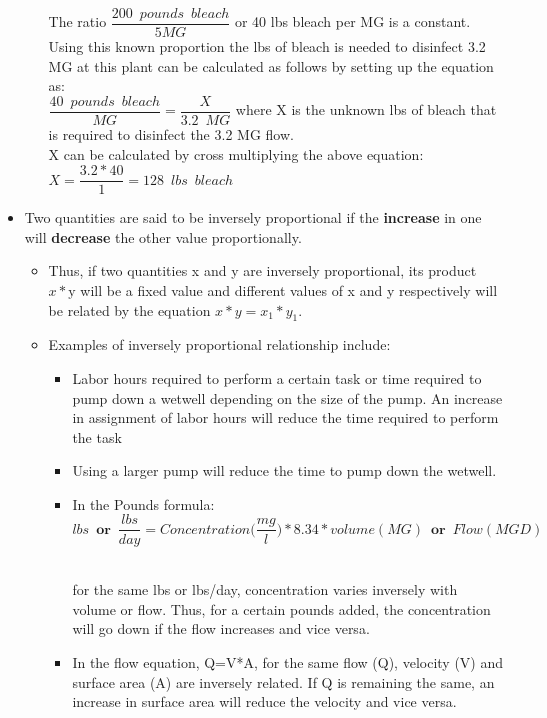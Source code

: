 \begin{itemize}
\begin{itemize}
The ratio $\dfrac{200 \enspace pounds \enspace bleach}{5 MG}$ or 40 lbs bleach per MG is a constant.  
Using this known proportion the lbs of bleach is needed to disinfect 3.2 MG at this plant can be calculated as follows by setting up the equation as:\\
\vspace{0.2cm}
$\dfrac{40 \enspace pounds \enspace bleach}{MG}=\dfrac{X}{3.2 \enspace MG}$ where X is the unknown lbs of bleach that is required to disinfect the 3.2 MG flow.\\
\vspace{0.2cm}
X can be calculated by cross multiplying the above equation: $X=\dfrac{3.2*40}{1}=128 \enspace lbs \enspace bleach$
\end{itemize}
\item Two quantities are said to be inversely proportional if the \textbf{increase} in one will \textbf{decrease} the other value proportionally.  
\begin{itemize}
\item Thus, if two quantities x and y are inversely proportional, its product $x * \text{y}$ will be a fixed value and different values of x and y respectively will be related by the equation $x *y = x_1 * y_1$.
\item Examples of inversely proportional relationship include:\\
\vspace{0.2cm}
\begin{itemize}
\item Labor hours required to perform a certain task or time required to pump down a wetwell depending on the size of the pump.  An increase in assignment of labor hours will reduce the time required to perform the task 
\item Using a larger pump will reduce the time to pump down the wetwell.  
\item In the Pounds formula:\\
\vspace{0.2cm}
$$lbs \enspace \textbf{or} \enspace \dfrac{lbs}{day}=Concentration\Big(\frac{mg}{l}\Big)*8.34*volume(MG) \enspace \textbf{or} \enspace Flow (MGD)$$\\
 
\vspace{0.2cm}

for the same lbs or lbs/day, concentration varies inversely with volume or flow.  Thus, for a certain pounds added, the concentration will go down if the flow increases and vice versa.
\item In the flow equation, Q=V*A, for the same flow (Q), velocity (V) and surface area (A) are inversely related.  If Q is remaining the same, an increase in surface area will reduce the velocity and vice versa.\\


\end{itemize}
\end{itemize}
\end{itemize}
